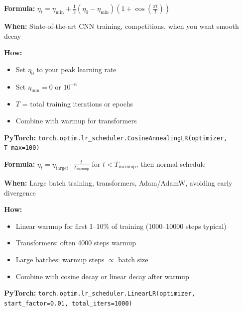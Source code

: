 \documentclass[../main.tex]{subfiles}
\begin{document}
\vspace{0.3cm}

\begin{tcolorbox}[colback=green!3, colframe=green!40, title={\textbf{Cosine Annealing}}, fonttitle=\bfseries]
\textbf{Formula:} $\eta_t = \eta_{\min} + \frac{1}{2}(\eta_0 - \eta_{\min})\left(1 + \cos\left(\frac{\pi t}{T}\right)\right)$

\textbf{When:} State-of-the-art CNN training, competitions, when you want smooth decay

\textbf{How:}
\begin{itemize}[leftmargin=*, itemsep=1pt]
    \item Set $\eta_0$ to your peak learning rate
    \item Set $\eta_{\min} = 0$ or $10^{-6}$
    \item $T$ = total training iterations or epochs
    \item Combine with warmup for transformers
\end{itemize}

\textbf{PyTorch:} \texttt{torch.optim.lr\_scheduler.CosineAnnealingLR(optimizer, T\_max=100)}
\end{tcolorbox}

\vspace{0.3cm}

\begin{tcolorbox}[colback=orange!3, colframe=orange!40, title={\textbf{Warmup}}, fonttitle=\bfseries]
\textbf{Formula:} $\eta_t = \eta_{\text{target}} \cdot \frac{t}{T_{\text{warmup}}}$ for $t < T_{\text{warmup}}$, then normal schedule

\textbf{When:} Large batch training, transformers, Adam/AdamW, avoiding early divergence

\textbf{How:}
\begin{itemize}[leftmargin=*, itemsep=1pt]
    \item Linear warmup for first 1--10\% of training (1000--10000 steps typical)
    \item Transformers: often 4000 steps warmup
    \item Large batches: warmup steps $\propto$ batch size
    \item Combine with cosine decay or linear decay after warmup
\end{itemize}

\textbf{PyTorch:} \texttt{torch.optim.lr\_scheduler.LinearLR(optimizer, start\_factor=0.01, total\_iters=1000)}
\end{tcolorbox}
\end{document}
